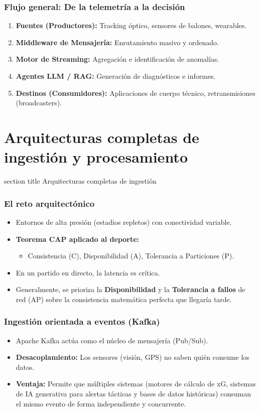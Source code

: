 \documentclass[aspectratio=169]{beamer}
\newcommand{\sectionpagetitle}[1]{
\begin{frame}
	\vspace{1cm}
	\begin{beamercolorbox}[sep=8pt,center,wd=\textwidth]{section title}
		\usebeamerfont{section title}#1\par
	\end{beamercolorbox}
\end{frame}
}
\begin{document}
\begin{frame}\frametitle{Flujo general: De la telemetría a la decisión}
\begin{enumerate}
    \item \textbf{Fuentes (Productores):} Tracking óptico, sensores de balones, wearables.
    \item \textbf{Middleware de Mensajería:} Enrutamiento masivo y ordenado.
    \item \textbf{Motor de Streaming:} Agregación e identificación de anomalías.
    \item \textbf{Agentes LLM / RAG:} Generación de diagnósticos e informes.
    \item \textbf{Destinos (Consumidores):} Aplicaciones de cuerpo técnico, retransmisiones (broadcasters).
\end{enumerate}
\end{frame}

\section{Arquitecturas completas de ingestión y procesamiento}
\sectionpagetitle{Arquitecturas completas de ingestión}

\begin{frame}\frametitle{El reto arquitectónico}
\begin{itemize}
    \item Entornos de alta presión (estadios repletos) con conectividad variable.
    \item \textbf{Teorema CAP aplicado al deporte:}
    \begin{itemize}
        \item Consistencia (C), Disponibilidad (A), Tolerancia a Particiones (P).
    \end{itemize}
    \item En un partido en directo, la latencia es crítica.
    \item Generalmente, se prioriza la \textbf{Disponibilidad} y la \textbf{Tolerancia a fallos} de red (AP) sobre la consistencia matemática perfecta que llegaría tarde.
\end{itemize}
\end{frame}

\begin{frame}\frametitle{Ingestión orientada a eventos (Kafka)}
\begin{itemize}
    \item Apache Kafka actúa como el núcleo de mensajería (Pub/Sub).
    \item \textbf{Desacoplamiento:} Los sensores (visión, GPS) no saben quién consume los datos.
    \item \textbf{Ventaja:} Permite que múltiples sistemas (motores de cálculo de xG, sistemas de IA generativa para alertas tácticas y bases de datos históricas) consuman el mismo evento de forma independiente y concurrente.
\end{itemize}
\end{frame}
\end{document}
